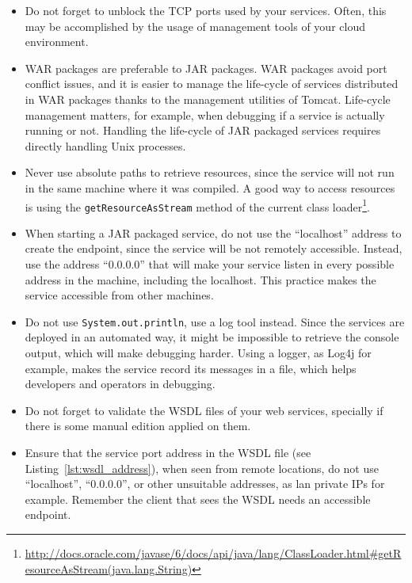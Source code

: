 \documentclass[a4paper, 10pt]{article}
\begin{document}
\begin{itemize}

\item Do not forget to unblock the TCP ports used by your services. Often, this may be accomplished by the usage of management tools of your cloud environment.

\item WAR packages are preferable to JAR packages. WAR packages avoid port conflict issues, and it is easier to manage the life-cycle of services distributed in WAR packages thanks to the management utilities of Tomcat. Life-cycle management matters, for example, when debugging if a service is actually running or not. Handling the life-cycle of JAR packaged services requires directly handling Unix processes.

\item Never use absolute paths to retrieve resources, since the service will not run in the same machine where it was compiled. A good way to access resources is using the \texttt{getResourceAsStream} method of the current class loader\footnote{\url{http://docs.oracle.com/javase/6/docs/api/java/lang/ClassLoader.html\#getResourceAsStream(java.lang.String)}}.

\item When starting a JAR packaged service, do not use the ``localhost'' address to create the endpoint, since the service will be not remotely accessible. Instead, use the address ``0.0.0.0'' that will make your service listen in every possible address in the machine, including the localhost. This practice makes the service accessible from other machines.

\item Do not use \texttt{System.out.println}, use a log tool instead. Since the services are deployed in an automated way, it might be impossible to retrieve the console output, which will make debugging harder. Using a logger, as Log4j for example, makes the service record its messages in a file, which helps developers and operators in debugging.

\item Do not forget to validate the WSDL files of your web services, specially if there is some manual edition applied on them.

\item Ensure that the service port address in the WSDL file (see Listing~\ref{lst:wsdl_address}), when seen from remote locations, do not use ``localhost'', ``0.0.0.0'', or other unsuitable addresses, as lan private IPs for example. Remember the client that sees the WSDL needs an accessible endpoint.


\end{itemize}
\end{document}
